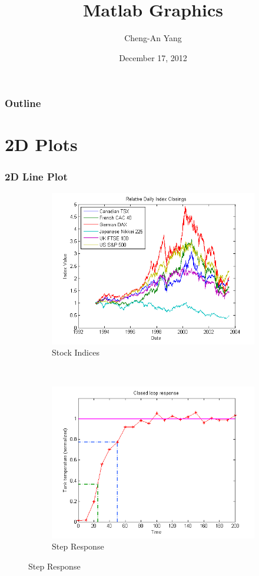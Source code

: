 \documentclass[compress]{beamer}  %
\title{Matlab Graphics}
\author{Cheng-An Yang}
\date{December 17, 2012}  %
\begin{document}
\frame{\titlepage}
\begin{frame}
\frametitle{Outline}
\tableofcontents[pausesections]
\end{frame}
\section{2D Plots}
\begin{frame}
\frametitle{2D Line Plot}

\begin{figure}
        \begin{subfigure}[b]{0.4\textwidth}
                \centering
                \includegraphics[width=\textwidth]{Line_Plot_2D_2_01.png}
                \caption{Stock Indices\cite{matlab_gallery} }
        \end{subfigure}%
        ~
        \begin{subfigure}[b]{0.4\textwidth}
                \centering
                \includegraphics[width=\textwidth]{Add_Lines_to_Plot_1_01.png}
                \caption{Step Response\cite{matlab_gallery}}
        \end{subfigure}
\end{figure}

  
\end{frame}
\end{document}
